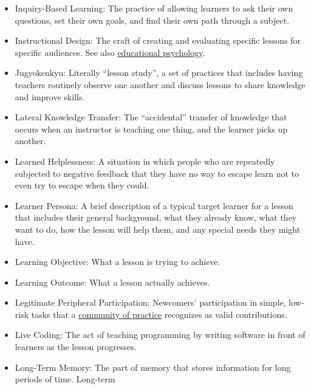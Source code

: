 \documentclass[10pt,statementpaper]{memoir}
\begin{document}
\begin{itemize}
\item
  \protect\hypertarget{inquiry-based-learning}{}{Inquiry-Based
  Learning}: The practice of allowing learners to ask their own
  questions, set their own goals, and find their own path through a
  subject.
\item
  \protect\hypertarget{instructional-design}{}{Instructional Design}:
  The craft of creating and evaluating specific lessons for specific
  audiences. See also
  \href{gloss.html\#educational-psychology}{educational psychology}.
\item
  \protect\hypertarget{jugyokenkyu}{}{Jugyokenkyu}: Literally ``lesson
  study'', a set of practices that includes having teachers routinely
  observe one another and discuss lessons to share knowledge and improve
  skills.
\item
  \protect\hypertarget{lateral-knowledge-transfer}{}{Lateral Knowledge
  Transfer}: The ``accidental'' transfer of knowledge that occurs when
  an instructor is teaching one thing, and the learner picks up another.
\item
  \protect\hypertarget{learned-helplessness}{}{Learned Helplessness}: A
  situation in which people who are repeatedly subjected to negative
  feedback that they have no way to escape learn not to even try to
  escape when they could.
\item
  \protect\hypertarget{learner-persona}{}{Learner Persona}: A brief
  description of a typical target learner for a lesson that includes
  their general background, what they already know, what they want to
  do, how the lesson will help them, and any special needs they might
  have.
\item
  \protect\hypertarget{learning-objective}{}{Learning Objective}: What a
  lesson is trying to achieve.
\item
  \protect\hypertarget{learning-outcome}{}{Learning Outcome}: What a
  lesson actually achieves.
\item
  \protect\hypertarget{legitimate-peripheral-participation}{}{Legitimate
  Peripheral Participation}: Newcomers' participation in simple,
  low-risk tasks that a
  \href{gloss.html\#community-of-practice}{community of practice}
  recognizes as valid contributions.
\item
  \protect\hypertarget{live-coding}{}{Live Coding}: The act of teaching
  programming by writing software in front of learners as the lesson
  progresses.
\item
  \protect\hypertarget{long-term-memory}{}{Long-Term Memory}: The part
  of memory that stores information for long periods of time. Long-term

\end{itemize}
\end{document}
